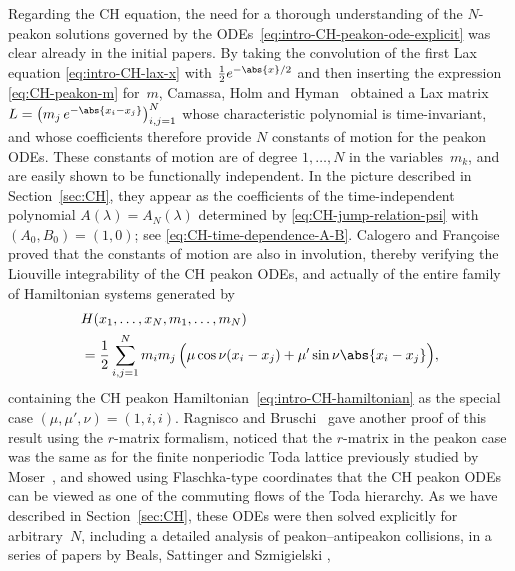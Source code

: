 \documentclass[10pt,a4paper]{article} \pdfoutput=1 
\begin{document}
Regarding the CH equation,
the need for a thorough understanding of the $N$-peakon solutions
governed by the ODEs~\eqref{eq:intro-CH-peakon-ode-explicit} was
clear already in the initial papers.
By taking the convolution of the first Lax equation \eqref{eq:intro-CH-lax-x}
with $\tfrac12 e^{-\abs{x}/2}$ and then inserting
the expression \eqref{eq:CH-peakon-m} for~$m$,
Camassa, Holm and Hyman~\cite{camassa-holm-hyman:1994:CH-new-integrable}
obtained a Lax matrix $L = \bigl( m_j \, e^{-\abs{x_i-x_j}} \bigr)_{i,j=1}^N$ whose
characteristic polynomial is time-invariant,
and whose coefficients therefore provide $N$ constants of motion for the peakon ODEs.
These constants of motion
are of degree $1,\dots,N$ in the variables~$m_k$,
and are easily shown to be functionally independent.
In the picture described in Section~\ref{sec:CH},
they appear as the coefficients of the time-independent polynomial
$A(\lambda) = A_N(\lambda)$
determined by \eqref{eq:CH-jump-relation-psi} with $(A_0,B_0)=(1,0)$;
see \eqref{eq:CH-time-dependence-A-B}.
Calogero and Françoise \cite{calogero-francoise:1996:cf-integrable}
proved that the constants of motion are also in involution, thereby verifying the
Liouville integrability of the CH peakon ODEs, and actually of the
entire family of Hamiltonian systems generated by
\begin{equation}
  \label{eq:guide-CF-hamiltonian}
  \begin{split}
    & H(x_1,\dots,x_N,m_1,\dots,m_N)
    \\ &
    = \frac12 \sum_{i,j=1}^N m_i m_j \,
    \Bigl( \mu \cos \nu (x_i-x_j)
    + \mu' \sin \nu \abs{x_i-x_j} \Bigr)
    ,
  \end{split}
\end{equation}
containing the CH peakon Hamiltonian~\eqref{eq:intro-CH-hamiltonian}
as the special case $(\mu,\mu',\nu) = (1,i,i)$.
Ragnisco and Bruschi~\cite{ragnisco-bruschi:1996:peakons-toda}
gave another proof of this result using the $r$-matrix formalism,
noticed that the $r$-matrix in the peakon case was the same as for the
finite nonperiodic Toda lattice previously studied by
Moser~\cite{moser:1975:finitely-many-point-masses-on-the-line, moser:1975:three-integrable},
and showed using Flaschka-type coordinates that
the CH peakon ODEs can be viewed as one of the commuting flows of the Toda hierarchy.
As we have described in Section~\ref{sec:CH},
these ODEs were then solved explicitly for arbitrary~$N$,
including a detailed analysis of peakon--antipeakon collisions,
in a series of papers by Beals, Sattinger and Szmigielski
\cite{beals-sattinger-szmigielski:1998:acoustic-scattering-KdV-hierarchy, beals-sattinger-szmigielski:1999:stieltjes, beals-sattinger-szmigielski:2000:moment},
\end{document}
